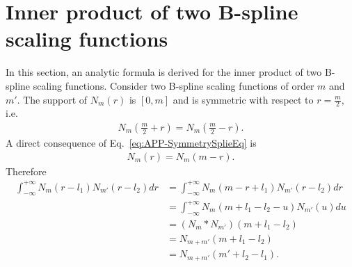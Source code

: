 \documentclass[review,authoryear,3p]{elsarticle}
\begin{document}
\section{Inner product of two B-spline scaling functions}\label{ap:InnerProductOfBsplines}
In this section, an analytic formula is derived for the inner product of two B-spline scaling functions. Consider two B-spline scaling functions of order $m$ and $m'$. The support of $N_m\left(r\right)$ is $\left[ 0,m\right]$ and  is symmetric with respect to $r=\frac{m}{2}$, i.e.
\begin{align}\label{eq:APP-SymmetrySplieEq}
 N_{m}\left(\frac{m}{2}+r\right)=N_{m}\left(\frac{m}{2}-r\right).
\end{align}
A direct consequence of Eq.~\eqref{eq:APP-SymmetrySplieEq} is 
\begin{align}
 N_{m}\left(r\right)=N_{m}\left(m-r\right).
\end{align}
Therefore
\begin{align}
\int_{-\infty}^{+\infty}N_{m}\left(r-l_{1}\right)N_{m'}\left(r-l_{2}\right)dr&=\int_{-\infty}^{+\infty}N_{m}\left(m-r+l_{1}\right)N_{m'}\left(r-l_{2}\right)dr \nonumber \\
&=\int_{-\infty}^{+\infty}N_{m}\left(m+l_{1}-l_{2}-u\right)N_{m'}\left(u\right)du \nonumber \\
&=\left(N_m \ast N_{m'}\right) \left(m+l_{1}-l_{2}\right) \nonumber \\
&=N_{m+m'}\left(m+l_{1}-l_{2}\right) \nonumber \\
&=N_{m+m'}\left(m'+l_{2}-l_{1}\right).
\end{align} 
\end{document}
